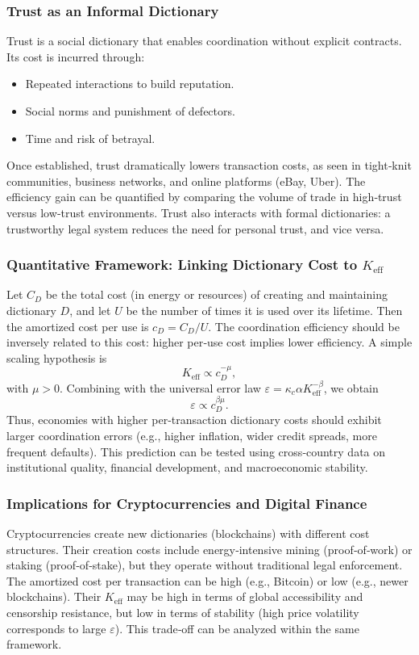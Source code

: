 \documentclass[11pt,a4paper]{article}
\newcommand{\Keff}{K_{\mathrm{eff}}}
\theoremstyle{remark}
\begin{document}
	\subsubsection{Trust as an Informal Dictionary}
	Trust is a social dictionary that enables coordination without explicit contracts. Its cost is incurred through:
	\begin{itemize}
		\item Repeated interactions to build reputation.
		\item Social norms and punishment of defectors.
		\item Time and risk of betrayal.
	\end{itemize}
	Once established, trust dramatically lowers transaction costs, as seen in tight‑knit communities, business networks, and online platforms (eBay, Uber). The efficiency gain can be quantified by comparing the volume of trade in high‑trust versus low‑trust environments. Trust also interacts with formal dictionaries: a trustworthy legal system reduces the need for personal trust, and vice versa.
	
	\subsubsection{Quantitative Framework: Linking Dictionary Cost to \(K_{\mathrm{eff}}\)}
	Let \(C_D\) be the total cost (in energy or resources) of creating and maintaining dictionary \(D\), and let \(U\) be the number of times it is used over its lifetime. Then the amortized cost per use is \(c_D = C_D / U\). The coordination efficiency should be inversely related to this cost: higher per‑use cost implies lower efficiency. A simple scaling hypothesis is
	\[
	\Keff \propto c_D^{-\mu},
	\]
	with \(\mu > 0\). Combining with the universal error law \(\varepsilon = \kappa_c \alpha \Keff^{-\beta}\), we obtain
	\[
	\varepsilon \propto c_D^{\beta\mu}.
	\]
	Thus, economies with higher per‑transaction dictionary costs should exhibit larger coordination errors (e.g., higher inflation, wider credit spreads, more frequent defaults). This prediction can be tested using cross‑country data on institutional quality, financial development, and macroeconomic stability.
	
	\subsubsection{Implications for Cryptocurrencies and Digital Finance}
	Cryptocurrencies create new dictionaries (blockchains) with different cost structures. Their creation costs include energy‑intensive mining (proof‑of‑work) or staking (proof‑of‑stake), but they operate without traditional legal enforcement. The amortized cost per transaction can be high (e.g., Bitcoin) or low (e.g., newer blockchains). Their \(\Keff\) may be high in terms of global accessibility and censorship resistance, but low in terms of stability (high price volatility corresponds to large \(\varepsilon\)). This trade‑off can be analyzed within the same framework.
	
\end{document}
